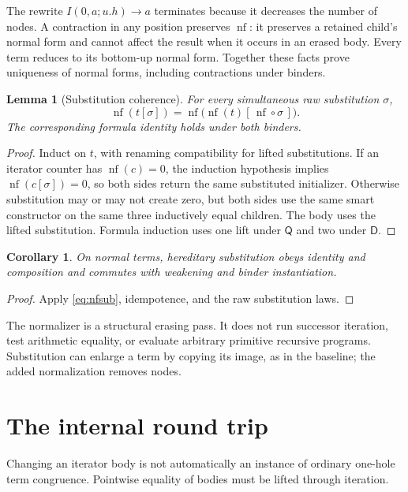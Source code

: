 \documentclass[11pt]{article}
\newtheorem{lemma}[theorem]{Lemma}
\newtheorem{corollary}[theorem]{Corollary}
\newcommand{\Q}{\mathsf Q}\newcommand{\D}{\mathsf D}
\newcommand{\nf}{\operatorname{nf}}\newcommand{\It}{\widehat I}
\begin{document}
The rewrite \(I(0,a;u.h)\to a\) terminates because it decreases the
number of nodes. A contraction in any position preserves \(\nf\):
it preserves a retained child's normal form and cannot affect the
result when it occurs in an erased body. Every term reduces to its
bottom-up normal form. Together these facts prove uniqueness of
normal forms, including contractions under binders.

\begin{lemma}[Substitution coherence]\label{lem:sub}
For every simultaneous raw substitution \(\sigma\),
\[
 \nf(t[\sigma])
       =\nf\bigl(\nf(t)[\,\nf\circ\sigma\,]\bigr).
                                                        \tag{NC}\label{eq:nfsub}
\]
The corresponding formula identity holds under both binders.
\end{lemma}
\begin{proof}
Induct on \(t\), with renaming compatibility for lifted substitutions.
If an iterator counter has \(\nf(c)=0\), the induction hypothesis
implies \(\nf(c[\sigma])=0\), so both sides return the same substituted
initializer. Otherwise substitution may or may not create zero, but
both sides use the same smart constructor on the same three
inductively equal children. The body uses the lifted substitution.
Formula induction uses one lift under \(\Q\) and two under \(\D\).
\end{proof}

\begin{corollary}
On normal terms, hereditary substitution obeys identity and composition and commutes
with weakening and binder instantiation.
\end{corollary}
\begin{proof}
Apply \eqref{eq:nfsub}, idempotence, and the raw substitution laws.
\end{proof}

The normalizer is a structural erasing pass. It does not run
successor iteration, test arithmetic equality, or evaluate arbitrary
primitive recursive programs. Substitution can enlarge a term by
copying its image, as in the baseline; the added normalization removes
nodes.

\section{The internal round trip}\label{sec:roundtrip}
Changing an iterator body is not automatically an instance of ordinary
one-hole term congruence. Pointwise equality of bodies must be lifted
through iteration.
\end{document}
